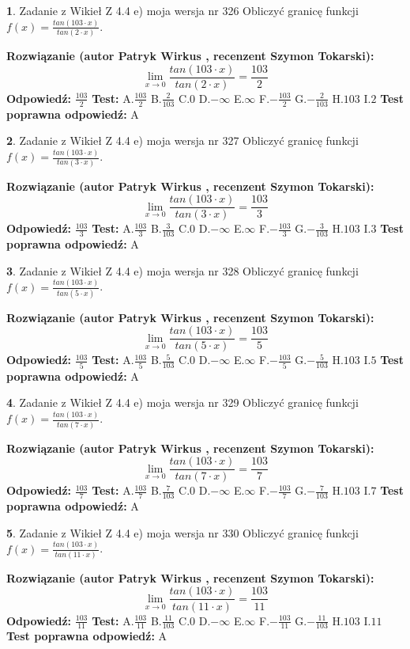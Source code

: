 \documentclass[12pt, a4paper]{article}
\theoremstyle{definition} %
\newtheorem{zad}{}
\newcommand{\zadStart}[1]{\begin{zad}#1\newline}
\newcommand{\zadStop}{\end{zad}}
\newcommand{\rozwStart}[2]{\noindent \textbf{Rozwiązanie (autor #1 , recenzent #2): }\newline}
\newcommand{\rozwStop}{\newline}
\newcommand{\odpStart}{\noindent \textbf{Odpowiedź:}\newline}
\newcommand{\odpStop}{\newline}
\newcommand{\testStart}{\noindent \textbf{Test:}\newline}
\newcommand{\testStop}{\newline}
\newcommand{\kluczStart}{\noindent \textbf{Test poprawna odpowiedź:}\newline}
\newcommand{\kluczStop}{\newline}
\begin{document}
\zadStart{Zadanie z Wikieł Z 4.4 e) moja wersja nr 326}
Obliczyć granicę funkcji $f(x)=\frac{tan(103\cdot x)}{tan(2\cdot x)}$.
\zadStop
\rozwStart{Patryk Wirkus}{Szymon Tokarski}
$$\lim\limits_{x\to 0}\frac{tan(103\cdot x)}{tan(2\cdot x)}=
\frac{103}{2}$$
\rozwStop
\odpStart
$\frac{103}{2}$
\odpStop
\testStart
A.$\frac{103}{2}$
B.$\frac{2}{103}$
C.$0$
D.$-\infty$
E.$\infty$
F.$-\frac{103}{2}$
G.$-\frac{2}{103}$
H.$103$
I.$2$
\testStop
\kluczStart
A
\kluczStop



\zadStart{Zadanie z Wikieł Z 4.4 e) moja wersja nr 327}
Obliczyć granicę funkcji $f(x)=\frac{tan(103\cdot x)}{tan(3\cdot x)}$.
\zadStop
\rozwStart{Patryk Wirkus}{Szymon Tokarski}
$$\lim\limits_{x\to 0}\frac{tan(103\cdot x)}{tan(3\cdot x)}=
\frac{103}{3}$$
\rozwStop
\odpStart
$\frac{103}{3}$
\odpStop
\testStart
A.$\frac{103}{3}$
B.$\frac{3}{103}$
C.$0$
D.$-\infty$
E.$\infty$
F.$-\frac{103}{3}$
G.$-\frac{3}{103}$
H.$103$
I.$3$
\testStop
\kluczStart
A
\kluczStop



\zadStart{Zadanie z Wikieł Z 4.4 e) moja wersja nr 328}
Obliczyć granicę funkcji $f(x)=\frac{tan(103\cdot x)}{tan(5\cdot x)}$.
\zadStop
\rozwStart{Patryk Wirkus}{Szymon Tokarski}
$$\lim\limits_{x\to 0}\frac{tan(103\cdot x)}{tan(5\cdot x)}=
\frac{103}{5}$$
\rozwStop
\odpStart
$\frac{103}{5}$
\odpStop
\testStart
A.$\frac{103}{5}$
B.$\frac{5}{103}$
C.$0$
D.$-\infty$
E.$\infty$
F.$-\frac{103}{5}$
G.$-\frac{5}{103}$
H.$103$
I.$5$
\testStop
\kluczStart
A
\kluczStop



\zadStart{Zadanie z Wikieł Z 4.4 e) moja wersja nr 329}
Obliczyć granicę funkcji $f(x)=\frac{tan(103\cdot x)}{tan(7\cdot x)}$.
\zadStop
\rozwStart{Patryk Wirkus}{Szymon Tokarski}
$$\lim\limits_{x\to 0}\frac{tan(103\cdot x)}{tan(7\cdot x)}=
\frac{103}{7}$$
\rozwStop
\odpStart
$\frac{103}{7}$
\odpStop
\testStart
A.$\frac{103}{7}$
B.$\frac{7}{103}$
C.$0$
D.$-\infty$
E.$\infty$
F.$-\frac{103}{7}$
G.$-\frac{7}{103}$
H.$103$
I.$7$
\testStop
\kluczStart
A
\kluczStop



\zadStart{Zadanie z Wikieł Z 4.4 e) moja wersja nr 330}
Obliczyć granicę funkcji $f(x)=\frac{tan(103\cdot x)}{tan(11\cdot x)}$.
\zadStop
\rozwStart{Patryk Wirkus}{Szymon Tokarski}
$$\lim\limits_{x\to 0}\frac{tan(103\cdot x)}{tan(11\cdot x)}=
\frac{103}{11}$$
\rozwStop
\odpStart
$\frac{103}{11}$
\odpStop
\testStart
A.$\frac{103}{11}$
B.$\frac{11}{103}$
C.$0$
D.$-\infty$
E.$\infty$
F.$-\frac{103}{11}$
G.$-\frac{11}{103}$
H.$103$
I.$11$
\testStop
\kluczStart
A
\kluczStop
\end{document}
